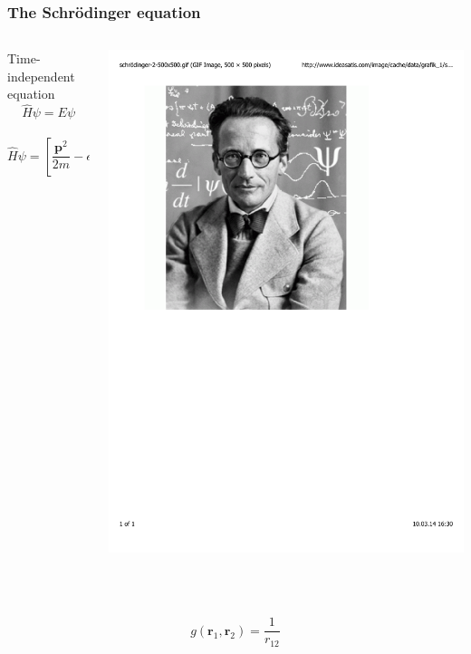 \documentclass[mathserif,10pt]{beamer}
\begin{document}
\begin{frame}
    \frametitle{The Schr\"{o}dinger equation}
    \begin{columns}
    \begin{column}{.50\textwidth}
	\centering
	Time-independent equation
	\begin{equation}
	\nonumber
	    \hat{H} \psi = E \psi
	\end{equation}
	\ \\
	\begin{equation}
	    \nonumber
	    \hat{H} \psi = \left[\frac{\boldsymbol{p}^2}{2m} - eV \right] \psi
	\end{equation}
    \ \\
    \end{column}
    \begin{column}{.50\textwidth}
	\centering
	\includegraphics[viewport = 90 405 400 795, clip, scale=0.23]{figures/schrodinger.pdf}
    \end{column}
    \end{columns}
    \ \\
    \ \\
    \begin{equation}
	\nonumber
        g(\boldsymbol{r}_1,\boldsymbol{r}_2) = \frac{1}{r_{12}}
    \end{equation}
\end{frame}
\end{document}
